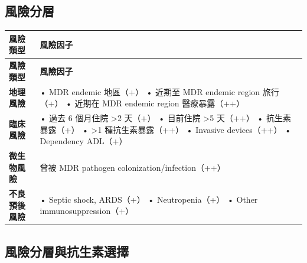 \documentclass[12pt,a4paper]{article}
\begin{document}
\subsection{風險分層}

\begin{longtable}{p{4cm}p{10cm}}
\toprule
\textbf{風險類型} & \textbf{風險因子} \\
\midrule
\endfirsthead

\toprule
\textbf{風險類型} & \textbf{風險因子} \\
\midrule
\endhead

\bottomrule
\endfoot

\textbf{地理風險} &
• MDR endemic 地區（+）\newline
• 近期至 MDR endemic region 旅行（+）\newline
• 近期在 MDR endemic region 醫療暴露（++）\\
\midrule
\textbf{臨床風險} &
• 過去 6 個月住院 >2 天（+）\newline
• 目前住院 >5 天（++）\newline
• 抗生素暴露（+）\newline
• >1 種抗生素暴露（++）\newline
• Invasive devices（++）\newline
• Dependency ADL（+）\\
\midrule
\textbf{微生物風險} & 曾被 MDR pathogen colonization/infection（++）\\
\midrule
\textbf{不良預後風險} &
• Septic shock, ARDS（+）\newline
• Neutropenia（+）\newline
• Other immunosuppression（+）\\
\bottomrule
\end{longtable}

\subsection{風險分層與抗生素選擇}

\end{document}
